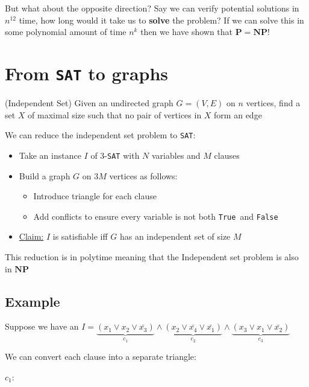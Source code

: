 \documentclass{article}
\newcommand{\True}{\texttt{True }}
\newcommand{\False}{\texttt{False }}
\newcommand{\NP}{\mathbf{NP}}
\renewcommand{\P}{\mathbf{P}}
\begin{document}
But what about the opposite direction? Say we can verify potential solutions in $n^{12}$ time, how long would it take us to \textbf{solve} the problem? If we can solve this in some polynomial amount of time $n^{k}$ then we have shown that $\P = \NP$!


\section{From \texttt{SAT} to graphs}

\begin{definition}(Independent Set)
  Given an undirected graph $G = (V,E)$ on $n$ vertices, find a set $X$ of maximal size such that no pair of vertices in $X$ form an edge
\end{definition}

We can reduce the independent set problem to \texttt{SAT}:

\begin{itemize}
  \item Take an instance $I$  of 3-\texttt{SAT} with $N$ variables and $M$ clauses
  \item Build a graph $G$ on 3$M$ vertices as follows:
        \begin{itemize}
          \item Introduce triangle for each clause
          \item Add conflicts to ensure every variable is not both \True and \False
        \end{itemize}
        \item \underline{Claim:} $I$ is satisfiable iff $G$ has an independent set of size $M$
\end{itemize}

This reduction is in polytime meaning that the Independent set problem is also in $\NP$

\subsection{Example}

Suppose we have an $I = \underbrace{(x_{1} \vee x_{2}\vee \bar{x_{3}})}_{c_{1}} \wedge \underbrace{(x_{2} \vee \bar{x_{4}} \vee \bar{x_{1}})}_{c_{2}} \wedge \underbrace{(x_{3} \vee x_{1} \vee \bar{x_{2}})}_{c_{3}}$

We can convert each clause into a separate triangle:

$c_{1}$:

\begin{center}
\end{center}
\end{document}
